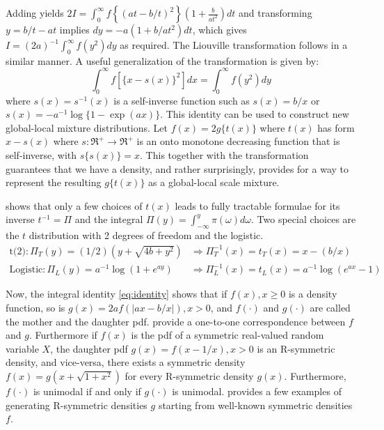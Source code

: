 \documentclass[lineno]{biometrika}
\begin{document}
Adding yields $2 I = \int_{0}^{\infty} f \left\{(at - b/t)^2 \right\} \left( 1+\frac{b}{at^2} \right) dt$ and transforming $y = b/t - at$ implies $dy = -a (1+b/at^2) dt$, which gives $I = (2a)^{-1} \int_{0}^{\infty} f(y^2) dy$ as required. 
The Liouville transformation follows in a similar manner. A useful generalization of the \CS transformation is given by: 
\begin{equation}
  \int_0^\infty f \left[ \{x-s(x)\}^2 \right] dx = \int_0^\infty f( y^2 ) dy \label{eq:gen}
\end{equation}
where $s(x)=s^{-1}(x)$ is a self-inverse function such as $s(x) = b/x$ or $s(x) = -a^{-1}\log\{1-\exp(a x)\}$. %
This identity can be used to construct new global-local mixture distributions. Let $f(x) = 2g\{ t(x) \}$ where $t(x)$ has form $x-s(x)$ where $s : \Re^+ \to \Re^+$ is an onto monotone decreasing function that is self-inverse, with $s\{ s(x)\} = x$. This together with the \CS transformation guarantees that we have a density, and rather surprisingly, provides for a way to represent the resulting $g\{t(x)\}$ as a global-local scale mixture. 

\citet{jones2014generating} shows that only a few choices of $t(x)$ leads to fully tractable formulae for its inverse $t^{-1}= \Pi$ and the integral $\Pi(y) = \int_{-\infty}^{y} \pi(\omega) d\omega$. Two special choices are the $t$ distribution with 2 degrees of freedom and the logistic. 
\begin{align*}
\mbox{t(2)}: \Pi_{T}(y) = (1/2)(y+\sqrt{4b+y^2}) & \Rightarrow \Pi_T^{-1}(x) = t_T(x) = x - (b/x) \\
\mbox{Logistic}: \Pi_{L}(y) = a^{-1} \log(1+e^{ay}) & \Rightarrow \Pi_L^{-1}(x) = t_L(x) = a^{-1} \log(e^{ax}-1) 
\end{align*}

Now, the integral identity \eqref{eq:identity} shows that if $f(x), x \geq 0$ is a density function, so is $g(x) = 2a f(|ax-b/x|), x >0$, and $f(\cdot)$ and $g(\cdot)$ are called the mother and the daughter pdf. \citet{chaubey2010reciprocal} provide a one-to-one correspondence between $f$ and $g$. Furthermore if $f(x)$ is the pdf of a symmetric real-valued random variable $X$, the daughter pdf $g(x) = f(x-1/x), x>0$ is an R-symmetric density, and vice-versa, there exists a symmetric density $f(x) = g(x+\sqrt{1+x^2})$ for every R-symmetric density $g(x)$. Furthermore, $f(\cdot)$ is unimodal if and only if $g(\cdot)$ is unimodal. \cite{chaubey2010reciprocal} provides a few examples of generating R-symmetric densities $g$ starting from well-known symmetric densities $f$. 
\end{document}
